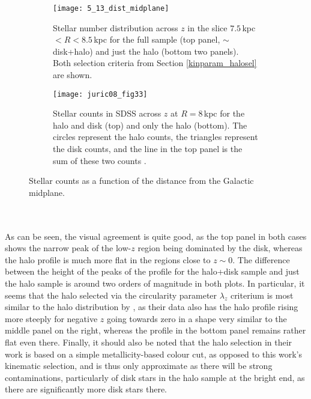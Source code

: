 \documentclass[a4paper,11pt]{article}
\begin{document}
\begin{figure}[ht]
 \centering
 \begin{minipage}[t]{0.45\textwidth}
 \begin{subfigure}[t]{\linewidth}
  \centering
  \texttt{[image: 5\_13\_dist\_midplane]}
  \caption{Stellar number distribution across $z$ in the slice $7.5$\,kpc $<R<8.5$\,kpc for the full sample (top panel, ${\sim}$disk+halo) and just the halo (bottom two panels). Both selection criteria from Section \ref{kinparam_halosel} are shown.}
 \end{subfigure}
 \end{minipage}\hfill
 \begin{minipage}[t]{0.45\textwidth}
 \begin{subfigure}[t]{\linewidth}
  \centering
  \texttt{[image: juric08\_fig33]}
  \caption{Stellar counts in SDSS across $z$ at $R=8$\,kpc for the halo and disk (top) and only the halo (bottom). The circles represent the halo counts, the triangles represent the disk counts, and the line in the top panel is the sum of these two counts \citep[][Fig. 33]{juric08}.}
 \end{subfigure}
 \end{minipage}
 \caption[Stellar number distribution in disk and halo]{Stellar counts as a function of the distance from the Galactic midplane.}
 \label{fig:stcounts_gcz}
\end{figure}\\ \\
%
As can be seen, the visual agreement is quite good, as the top panel in both cases shows the narrow peak of the low-$z$ region being dominated by the disk, whereas the halo profile is much more flat in the regions close to $z\sim0$. The difference between the height of the peaks of the profile for the halo+disk sample and just the halo sample is around two orders of magnitude in both plots. In particular, it seems that the halo selected via the circularity parameter $\lambda_z$ criterium is most similar to the halo distribution by \citet{juric08}, as their data also has the halo profile rising more steeply for negative $z$ going towards zero in a shape very similar to the middle panel on the right, whereas the profile in the bottom panel remains rather flat even there. Finally, it should also be noted that the halo selection in their work is based on a simple metallicity-based colour cut, as opposed to this work's kinematic selection, and is thus only approximate as there will be strong contaminations, particularly of disk stars in the halo sample at the bright end, as there are significantly more disk stars there.\\ \\
\end{document}
